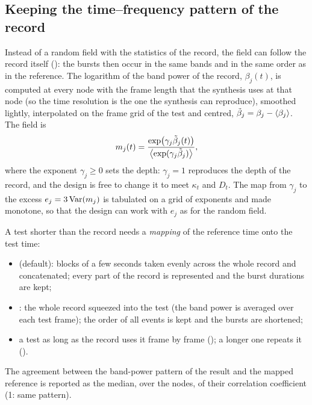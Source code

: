\subsection{Keeping the time--frequency pattern of the record}\label{sec:pattern}

Instead of a random field with the statistics of the record, the field can follow the record itself
(): the bursts then occur in the same bands and in the same order as in
the reference. The logarithm of the band power of the record, $\beta_j(t)$, is computed at every node
with the frame length that the synthesis uses at that node (so the time resolution is the one the
synthesis can reproduce), smoothed lightly, interpolated on the frame grid of the test and centred,
$\tilde\beta_j = \beta_j - \left\langle \beta_j \right\rangle$. The field is
\begin{equation}
  m_j(t) = \frac{\exp\bigl(\gamma_j\tilde\beta_j(t)\bigr)}{\left\langle \exp(\gamma_j\tilde\beta_j) \right\rangle} ,
\end{equation}
where the exponent $\gamma_j\ge0$ sets the depth: $\gamma_j=1$ reproduces the depth of the record, and
the design is free to change it to meet $\kappa_t$ and $D_t$. The map from $\gamma_j$ to the excess
$e_j = 3\operatorname{Var}(m_j)$ is tabulated on a grid of exponents and made monotone, so that the design can
work with $e_j$ as for the random field.

A test shorter than the record needs a \emph{mapping} of the reference time onto the test time:
\begin{itemize}[nosep]
\item {} (default): blocks of a few seconds taken evenly across the whole record and
concatenated; every part of the record is represented and the burst durations are kept;
\item {}: the whole record squeezed into the test (the band power is averaged over each
test frame); the order of all events is kept and the bursts are shortened;
\item a test as long as the record uses it frame by frame (); a longer one repeats it
().
\end{itemize}
The agreement between the band-power pattern of the result and the mapped reference is reported as
the median, over the nodes, of their correlation coefficient (1: same pattern).
